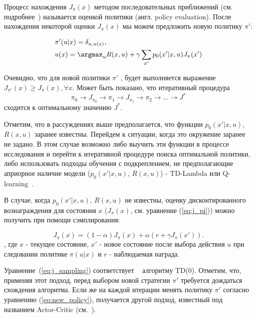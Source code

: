 Процесс нахождения $J_\pi(x)$ методом последовательных приближений (см. подробнее~\cite{sutton1998reinforcement}) называется оценкой политики (англ. policy evaluation). После нахождения некоторой оценки  $J_\pi(x)$ мы можем предложить новую политику $\pi'$:

\begin{equation}
    \label{eq:new_policy}
    \begin{split}
    & \pi'(u|x) = \delta_{u,u(x)}, \\
    & u(x) = \argmax_u R(x, u) + \gamma \sum_{x'} p_0(x'|x, u)J_\pi(x')
    \end{split}
\end{equation}

Очевидно, что для новой политики $\pi'$ , будет выполняется выражение $J_{\pi'}(x) \geq J_\pi(x), \forall x$. Может быть показано, что итеративный процедура $$\pi_0 \rightarrow J_{\pi_0} \rightarrow \pi_1 \rightarrow J_{\pi_1} \rightarrow \pi_2 \rightarrow ... \rightarrow J^*$$ сходится  к оптимальному значению $J^*$.

Отметим, что в рассуждениях выше предполагается, что функции $p_0(x'|x,u)$, $R(x,u)$ заранее известны. Перейдем к ситуации, когда это окружение заранее не задано. В этом случае возможно либо выучить эти функции в процессе исследования и перейти к итеративной процедуре поиска оптимальной политики, либо использовать подходы обучения с подкреплением, не предполагающие априорное наличие модели ($p_0(x'|x,u)$, $R(x,u)$) - TD-Lambda \cite{sutton1998reinforcement} или Q-learning~\cite{Watkins:1989}.

В случае, когда $p_0(x'|x,u)$, $R(x,u)$ не известны, оценку дисконтированного вознаграждения для состояния $x$ ($J_\pi(x)$, см. уравнение (\ref{eq:j_pi})) можно получить при помощи сэмплирования:

\begin{equation}
    \label{eq:j_sampling}
   	J_\pi(x) = (1-\alpha)J_\pi(x) + \alpha(r + \gamma J_\pi(x')).
\end{equation}
, где $x$ - текущее состояние, $x'$ - новое состояние после выбора действия $u$ при следовании политике $\pi(u|x)$ и $r$ - наблюдаемая награда.

Уравнение~(\ref{eq:j_sampling}) соответствует ~\cite{sutton1998reinforcement} алгоритму TD(0). Отметим, что, применяя этот подход, перед выбором новой стратегии $\pi'$ требуется дождаться схождения алгоритма. Если же на каждой итерации менять политику $\pi'$ согласно уравнению (\ref{eq:new_policy}), получается другой подход, известный под названием Actor-Critic (см.~\cite{actor_critic}).

